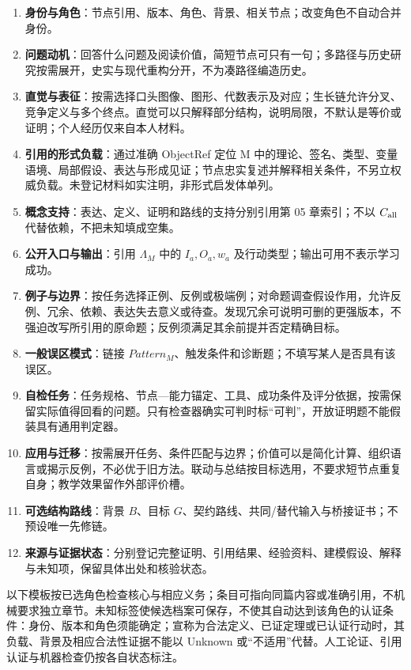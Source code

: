 \documentclass[UTF8,a4paper,zihao=-4,fontset=windows,openany]{ctexbook}
\begin{document}
\begin{enumerate}
\item \textbf{身份与角色}：节点引用、版本、角色、背景、相关节点；改变角色不自动合并身份。
\item \textbf{问题动机}：回答什么问题及阅读价值，简短节点可只有一句；多路径与历史研究按需展开，史实与现代重构分开，不为凑路径编造历史。
\item \textbf{直觉与表征}：按需选择口头图像、图形、代数表示及对应；生长链允许分叉、竞争定义与多个终点。直觉可以只解释部分结构，说明局限，不默认是等价或证明；个人经历仅来自本人材料。
\item \textbf{引用的形式负载}：通过准确 ObjectRef 定位 M 中的理论、签名、类型、变量语境、局部假设、表达与形成见证；节点忠实复述并解释相关条件，不另立权威负载。未登记材料如实注明，非形式启发体单列。
\item \textbf{概念支持}：表达、定义、证明和路线的支持分别引用第 05 章索引；不以 \(C_{\rm all}\) 代替依赖，不把未知填成空集。
\item \textbf{公开入口与输出}：引用 \(\Lambda_M\) 中的 \(I_a,O_a,w_a\) 及行动类型；输出可用不表示学习成功。
\item \textbf{例子与边界}：按任务选择正例、反例或极端例；对命题调查假设作用，允许反例、冗余、依赖、表达失去意义或待查。发现冗余可说明可删的更强版本，不强迫改写所引用的原命题；反例须满足其余前提并否定精确目标。
\item \textbf{一般误区模式}：链接 \(Pattern_M\)、触发条件和诊断题；不填写某人是否具有该误区。
\item \textbf{自检任务}：任务规格、节点—能力锚定、工具、成功条件及评分依据，按需保留实际值得回看的问题。只有检查器确实可判时标“可判”，开放证明题不能假装具有通用判定器。
\item \textbf{应用与迁移}：按需展开任务、条件匹配与边界；价值可以是简化计算、组织语言或揭示反例，不必优于旧方法。联动与总结按目标选用，不要求短节点重复自身；教学效果留作外部评价槽。
\item \textbf{可选结构路线}：背景 \(B\)、目标 \(G\)、契约路线、共同/替代输入与桥接证书；不预设唯一先修链。
\item \textbf{来源与证据状态}：分别登记完整证明、引用结果、经验资料、建模假设、解释与未知项，保留具体出处和核验状态。
\end{enumerate}
以下模板按已选角色检查核心与相应义务；条目可指向同篇内容或准确引用，不机械要求独立章节。未知标签使候选档案可保存，不使其自动达到该角色的认证条件：身份、版本和角色须能确定；宣称为合法定义、已证定理或已认证行动时，其负载、背景及相应合法性证据不能以 Unknown 或“不适用”代替。人工论证、引用认证与机器检查仍按各自状态标注。
\end{document}
